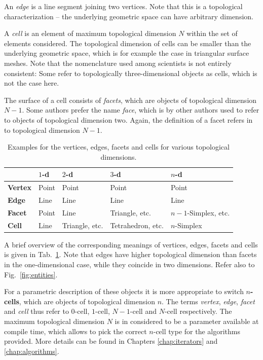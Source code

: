 An \emph{edge} is a line segment joining two vertices. Note that this is a topological characterization -- the underlying geometric space can have arbitrary dimension.

A \emph{cell} is an element of maximum topological dimension $N$ within the set of elements considered. The topological dimension of cells can be smaller than the underlying geometric space, which is for example the case in triangular surface meshes. Note that the nomenclature used among scientists is not entirely consistent: Some refer to topologically three-dimensional objects as cells, which is not the case here. 

The surface of a cell consists of \emph{facets}, which are objects of topological dimension $N-1$. Some authors prefer the name \emph{face}, which is by other authors used to refer to objects of topological dimension two. Again, the definition of a facet refers in {\ViennaGrid} to topological dimension $N-1$.

\begin{table}[tb]
 \centering 
 \renewcommand{\arraystretch}{1.3}
\begin{tabular}{|l|l|l|l|l|}
\hline
          &  $1$-d & $2$-d & $3$-d & $n$-d \\
\hline
 \textbf{Vertex}   & Point  & Point & Point & Point \\
 \textbf{Edge}     & Line   & Line  & Line  & Line \\
 \textbf{Facet}   & Point  & Line  & Triangle, etc. & $n-1$-Simplex, etc. \\
 \textbf{Cell}   & Line   & Triangle, etc. & Tetrahedron, etc. & $n$-Simplex \\
\hline
\end{tabular}
\caption{Examples for the vertices, edges, facets and cells for various topological dimensions.}
\label{tab:vertex-edge-facet-cell}
\end{table}

A brief overview of the corresponding meanings of vertices, edges, facets and cells is given in Tab.~\ref{tab:vertex-edge-facet-cell}. Note that edges have higher topological dimension than facets in the one-dimensional case, while they coincide in two dimensions. Refer also to Fig.~\ref{fig:entities}.

For a parametric description of these objects it is more appropriate to switch \textbf{$n$-cells}, which are objects of topological dimension $n$. The terms \emph{vertex}, \emph{edge}, \emph{facet} and \emph{cell} thus refer to $0$-cell, $1$-cell, $N-1$-cell and $N$-cell respectively. The maximum topological dimension $N$ is in {\ViennaGrid} considered to be a parameter available at compile time, which allows to pick the correct $n$-cell type for the algorithms provided. More details can be found in Chapters \ref{chap:iterators} and \ref{chap:algorithms}.


